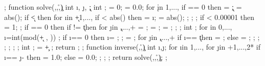 {{  };
  function solve(\n,\m,\r,\c) {
    int \i, \j, \k;
    int \stop;
    \stop = 0;
    \result = 0.0;
    for \k in {1,...,\n} {
      if \stop == 0 then {
        \pivotRow = \k;
        \pivot = abs(\a{\k,\k});
        if \k < \n then {
          for \i in {\k+1,...,\n} {
            if \pivot < abs(\a{\i,\k}) then {
              \pivotRow = \i;
              \pivot = abs(\a{\i,\k});
            };
          };
        };
        if \pivot < 0.00001 then { 
          \stop = 1;
        };
        if \stop == 0 then {
          if \pivotRow != \k then {
            for \j in {\k,...,\n+\m}{
              \temp = \a{\k,\j};
              \a{\k,\j} = \a{\pivotRow,\j};
              \a{\pivotRow,\j} = \temp;
            };
          };
          int \next;
          for \next in {0,...,}{
            \i =int(mod(\k + \next, \n)) ;
            if \i == 0 then {
              \i = \n;
            };
            \temp = \a{\i,\k};
            for \j in {\k,...,\n+\m}{
              if \i == \k then {
                \a{\i,\j} = \fpeval{\a{\i,\j} / \temp};
              } else {%
                \a{\i,\j} = \fpeval{\a{\i,\j} - \temp * \a{\k,\j}};
              };
            };
          };
        };%
      };%
    };%
    int \cumn;
    \cumn = \c + \n;
    return \a{\r,\cumn};
  };%
  function inverse(\n,\r,\c){
    int \i,\j;
    for \i in {1,...,\n}{
      for \j in {\n+1,...,2*\n}{
        if \i == \j - \n then {
          \a{\i,\j} = 1.0;
        } else {
          \a{\i,\j} = 0.0;
        };
      };
    };
    return solve(\n,\n,\r,\c);
  };
}
